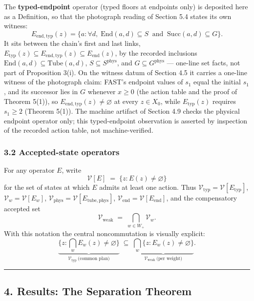 \documentclass[11pt]{article}
\begin{document}
The \textbf{typed-endpoint} operator (typed floors at endpoints only) is
deposited here as a Definition, so that the photograph reading of
Section 5.4 states its own witness:
\[E_{\mathrm{end,typ}}(z) = \{ a : \forall d,\; \mathrm{End}(a,d) \subseteq S \ \text{ and } \ \mathrm{Succ}(a,d) \subseteq G \}.\]
It sits between the chain's first and last links,
\(E_{\mathrm{typ}}(z) \subseteq E_{\mathrm{end,typ}}(z) \subseteq E_{\mathrm{end}}(z)\),
by the recorded inclusions
\(\mathrm{End}(a,d) \subseteq \mathrm{Tube}(a,d)\),
\(S \subseteq S^{\mathrm{phys}}\), and \(G \subseteq G^{\mathrm{phys}}\)
--- one-line set facts, not part of Proposition 3(i). On the witness
datum of Section 4.5 it carries a one-line witness of the photograph
claim: FAST's endpoint values of \(s_1\) equal the initial \(s_1\), and
its successor lies in \(G\) whenever \(x \ge 0\) (the action table and
the proof of Theorem 5(1)), so
\(E_{\mathrm{end,typ}}(z) \neq \varnothing\) at every \(z \in X_0\),
while \(E_{\mathrm{typ}}(z)\) requires \(s_1 \ge 2\) (Theorem 5(1)). The
machine artifact of Section 4.9 checks the physical endpoint operator
only; this typed-endpoint observation is asserted by inspection of the
recorded action table, not machine-verified.

\subsubsection{3.2 Accepted-state
operators}\label{accepted-state-operators}

For any operator \(E\), write
\[\mathcal{V}[E] \;=\; \{ z : E(z) \neq \varnothing \}\] for the set of
states at which \(E\) admits at least one action. Thus
\(\mathcal{V}_{\mathrm{typ}} = \mathcal{V}[E_{\mathrm{typ}}]\),
\(\mathcal{V}_w = \mathcal{V}[E_w]\),
\(\mathcal{V}_{\mathrm{phys}} = \mathcal{V}[E_{\mathrm{tube,phys}}]\),
\(\mathcal{V}_{\mathrm{end}} = \mathcal{V}[E_{\mathrm{end}}]\), and the
compensatory accepted set
\[\mathcal{V}_{\mathrm{weak}} \;=\; \bigcap_{w \in W_+} \mathcal{V}_w .\]
With this notation the central noncommutation is visually explicit:
\[\underbrace{\{ z : \textstyle\bigcap_w E_w(z) \neq \varnothing \}}_{\mathcal{V}_{\mathrm{typ}} \ \text{(common plan)}} \;\subseteq\; \underbrace{\bigcap_w \{ z : E_w(z) \neq \varnothing \}}_{\mathcal{V}_{\mathrm{weak}} \ \text{(per weight)}}.\]

\begin{center}\rule{0.5\linewidth}{0.5pt}\end{center}

\subsection{4. Results: The Separation
Theorem}\label{results-the-separation-theorem}
\end{document}
